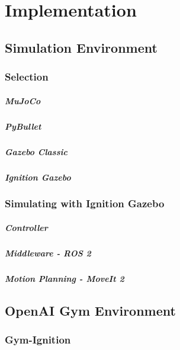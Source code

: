 \chapter{Implementation}


\section{Simulation Environment}

\subsection{Selection}
\paragraph{MuJoCo}
\paragraph{PyBullet}
\paragraph{Gazebo Classic}
\paragraph{Ignition Gazebo}

\subsection{Simulating with Ignition Gazebo}
\paragraph{Controller}
\paragraph{Middleware - ROS 2}
\paragraph{Motion Planning - MoveIt 2}


\section{OpenAI Gym Environment}

\subsection{Gym-Ignition}


